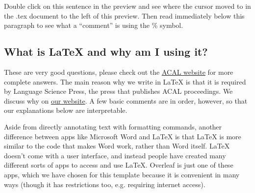 \documentclass[output=paper,colorlinks,citecolor=brown,
]{langscibook}
\begin{document}
Double click on this sentence in the preview and see where the cursor moved to in the .tex document to the left of this preview. Then read immediately below this paragraph to see what a ``comment'' is using the \% symbol. 



\subsection{What is \LaTeX{} and why am I using it?}

These are very good questions, please check out the \href{https://acal.linguistlist.org/annual-conference-proceedings/}{ACAL website} for more complete answers. The main reason why we write in \LaTeX{} is that it is required by Language Science Press, the press that publishes ACAL proceedings. We discuss why on  \href{https://acal.linguistlist.org/annual-conference-proceedings/}{our website}. A few basic comments are in order, however, so that our explanations below are interpretable. 

Aside from directly annotating text with formatting commands, another difference between apps like Microsoft Word and \LaTeX{} is that \LaTeX{} is more similar to the code that makes Word work, rather than Word itself. \LaTeX{} doesn't come with a user interface, and instead people have created many different sorts of apps to access and use \LaTeX. Overleaf is just one of these apps, which we have chosen for this template because it is convenient in many ways (though it has restrictions too, e.g. requiring internet access).
\end{document}
